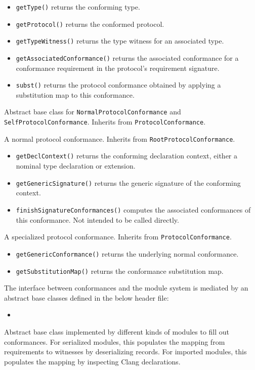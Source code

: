 \documentclass[../generics]{subfiles}
\begin{document}
\begin{itemize}
\item \texttt{getType()} returns the conforming type.
\item \texttt{getProtocol()} returns the conformed protocol.
\item \texttt{getTypeWitness()} returns the type witness for an associated type.
\item \texttt{getAssociatedConformance()} returns the associated conformance for a conformance requirement in the protocol's requirement signature.
\item \texttt{subst()} returns the protocol conformance obtained by applying a substitution map to this conformance.
\end{itemize}

Abstract base class for \texttt{NormalProtocolConformance} and \texttt{SelfProtocolConformance}. Inherits from \texttt{ProtocolConformance}.

A normal protocol conformance. Inherits from \texttt{RootProtocolConformance}.
\begin{itemize}
\item \texttt{getDeclContext()} returns the conforming declaration context, either a nominal type declaration or extension.
\item \texttt{getGenericSignature()} returns the generic signature of the conforming context.
\item \texttt{finishSignatureConformances()} computes the associated conformances of this conformance. Not intended to be called directly.
\end{itemize}

A specialized protocol conformance. Inherits from \texttt{ProtocolConformance}.
\begin{itemize}
\item \texttt{getGenericConformance()} returns the underlying normal conformance.
\item \texttt{getSubstitutionMap()} returns the conformance substitution map.
\end{itemize}

The interface between conformances and the module system is mediated by an abstract base classes defined in the below header file:
\begin{itemize}
\item {}
\end{itemize}

Abstract base class implemented by different kinds of modules to fill out conformances. For serialized modules, this populates the mapping from requirements to witnesses by deserializing records. For imported modules, this populates the mapping by inspecting Clang declarations.
\end{document}

